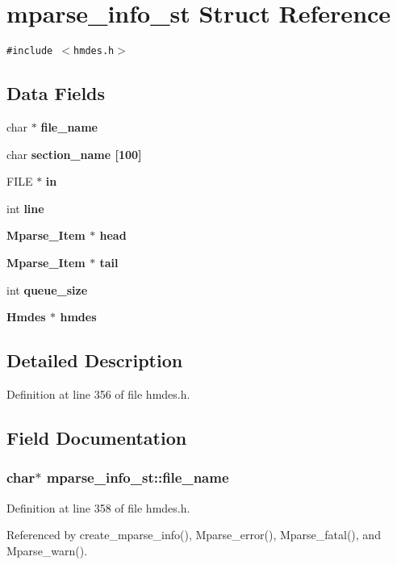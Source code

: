 \section{mparse\_\-info\_\-st Struct Reference}
\label{structmparse__info__st}
{\tt \#include $<$hmdes.h$>$}

\subsection*{Data Fields}
\begin{CompactItemize}
\item 
char $\ast$ \bf{file\_\-name}
\item 
char \bf{section\_\-name} [100]
\item 
FILE $\ast$ \bf{in}
\item 
int \bf{line}
\item 
\bf{Mparse\_\-Item} $\ast$ \bf{head}
\item 
\bf{Mparse\_\-Item} $\ast$ \bf{tail}
\item 
int \bf{queue\_\-size}
\item 
\bf{Hmdes} $\ast$ \bf{hmdes}
\end{CompactItemize}


\subsection{Detailed Description}




Definition at line 356 of file hmdes.h.

\subsection{Field Documentation}
\subsubsection{\setlength{\rightskip}{0pt plus 5cm}char$\ast$ \bf{mparse\_\-info\_\-st::file\_\-name}}\label{structmparse__info__st_f73004c9cea9694234312a562f0d2c72}




Definition at line 358 of file hmdes.h.

Referenced by create\_\-mparse\_\-info(), Mparse\_\-error(), Mparse\_\-fatal(), and Mparse\_\-warn().
